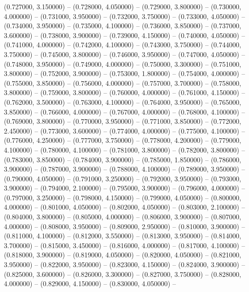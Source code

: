 (0.727000, 3.150000) -- 
(0.728000, 4.050000) -- 
(0.729000, 3.800000) -- 
(0.730000, 4.000000) -- 
(0.731000, 3.950000) -- 
(0.732000, 3.750000) -- 
(0.733000, 4.050000) -- 
(0.734000, 3.950000) -- 
(0.735000, 4.100000) -- 
(0.736000, 3.850000) -- 
(0.737000, 3.600000) -- 
(0.738000, 3.900000) -- 
(0.739000, 4.150000) -- 
(0.740000, 4.050000) -- 
(0.741000, 4.000000) -- 
(0.742000, 4.100000) -- 
(0.743000, 3.750000) -- 
(0.744000, 3.750000) -- 
(0.745000, 3.800000) -- 
(0.746000, 3.950000) -- 
(0.747000, 4.050000) -- 
(0.748000, 3.950000) -- 
(0.749000, 4.000000) -- 
(0.750000, 3.300000) -- 
(0.751000, 3.800000) -- 
(0.752000, 3.900000) -- 
(0.753000, 1.800000) -- 
(0.754000, 4.000000) -- 
(0.755000, 3.850000) -- 
(0.756000, 4.000000) -- 
(0.757000, 3.700000) -- 
(0.758000, 3.800000) -- 
(0.759000, 3.800000) -- 
(0.760000, 4.000000) -- 
(0.761000, 4.150000) -- 
(0.762000, 3.500000) -- 
(0.763000, 4.100000) -- 
(0.764000, 3.950000) -- 
(0.765000, 3.850000) -- 
(0.766000, 4.000000) -- 
(0.767000, 4.000000) -- 
(0.768000, 4.100000) -- 
(0.769000, 3.800000) -- 
(0.770000, 3.950000) -- 
(0.771000, 3.850000) -- 
(0.772000, 2.450000) -- 
(0.773000, 3.600000) -- 
(0.774000, 4.000000) -- 
(0.775000, 4.100000) -- 
(0.776000, 4.250000) -- 
(0.777000, 3.750000) -- 
(0.778000, 4.200000) -- 
(0.779000, 4.100000) -- 
(0.780000, 4.100000) -- 
(0.781000, 3.800000) -- 
(0.782000, 3.800000) -- 
(0.783000, 3.850000) -- 
(0.784000, 3.900000) -- 
(0.785000, 1.850000) -- 
(0.786000, 3.900000) -- 
(0.787000, 3.900000) -- 
(0.788000, 4.100000) -- 
(0.789000, 3.950000) -- 
(0.790000, 4.050000) -- 
(0.791000, 3.250000) -- 
(0.792000, 3.950000) -- 
(0.793000, 3.900000) -- 
(0.794000, 2.100000) -- 
(0.795000, 3.900000) -- 
(0.796000, 4.000000) -- 
(0.797000, 3.250000) -- 
(0.798000, 4.150000) -- 
(0.799000, 4.050000) -- 
(0.800000, 4.000000) -- 
(0.801000, 4.050000) -- 
(0.802000, 4.050000) -- 
(0.803000, 2.100000) -- 
(0.804000, 3.800000) -- 
(0.805000, 4.000000) -- 
(0.806000, 3.900000) -- 
(0.807000, 4.000000) -- 
(0.808000, 3.950000) -- 
(0.809000, 2.950000) -- 
(0.810000, 3.900000) -- 
(0.811000, 4.100000) -- 
(0.812000, 3.550000) -- 
(0.813000, 3.950000) -- 
(0.814000, 3.700000) -- 
(0.815000, 3.450000) -- 
(0.816000, 4.000000) -- 
(0.817000, 4.100000) -- 
(0.818000, 3.900000) -- 
(0.819000, 4.050000) -- 
(0.820000, 4.050000) -- 
(0.821000, 3.950000) -- 
(0.822000, 3.950000) -- 
(0.823000, 4.150000) -- 
(0.824000, 3.900000) -- 
(0.825000, 3.600000) -- 
(0.826000, 3.300000) -- 
(0.827000, 3.750000) -- 
(0.828000, 4.000000) -- 
(0.829000, 4.150000) -- 
(0.830000, 4.050000) -- 
